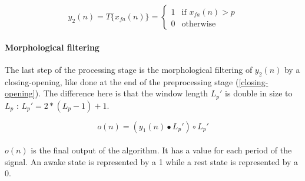 \documentclass[a4paper,12pt]{article}
\begin{document}
\begin{equation}
y_2(n) = T\{x_{fa}(n)\} = \left\{
    \begin{array}{ll}
        1 & \mbox{if } x_{fa}(n) > p \\
        0 & \mbox{otherwise}
    \end{array}
\right.\end{equation}

\paragraph{Morphological filtering}
The last step of the processing stage is the morphological filtering of $y_2(n)$ by a closing-opening, like done at the end of the preprocessing stage (\ref{closing-opening}). The difference here is that the window length $L_p'$ is double in size to $L_p$ : $L_p' = 2 * (L_p - 1) + 1$.

\begin{equation}
o(n) = (y_1(n) \bullet L_p') \circ L_p'
\end{equation}

\paragraph{}
$o(n)$ is the final output of the algorithm. It has a value for each period of the signal. An awake state is represented by a 1 while a rest state is represented by a 0.
\end{document}
